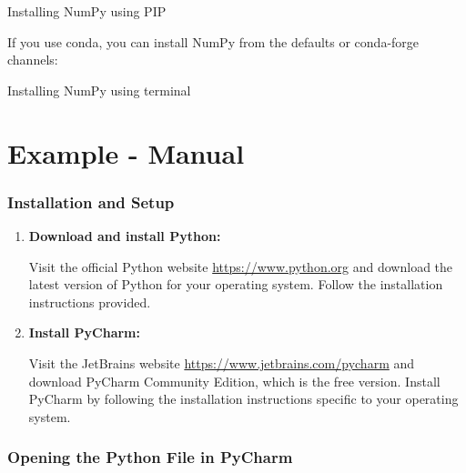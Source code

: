 \begin{code}[h!]
	    
	\caption{Installing NumPy using PIP}
\end{code}

\bigskip

If you use conda, you can install NumPy from the defaults or conda-forge channels:


\begin{code}[h!]
	    
	\caption{Installing NumPy using terminal}
	
\end{code}

\section{Example - Manual}

\subsubsection{Installation and Setup}

\begin{enumerate}
	
	\item \textbf{Download and install Python:}
	
	Visit the official Python website \url{https://www.python.org} and download the latest version of Python for your operating system. Follow the installation instructions provided.
	
	\item \textbf{Install PyCharm: }
	
	Visit the JetBrains website \url{https://www.jetbrains.com/pycharm} and download PyCharm Community Edition, which is the free version. Install PyCharm by following the installation instructions specific to your operating system.
	
\end{enumerate}

\subsubsection{Opening the Python File in PyCharm}

